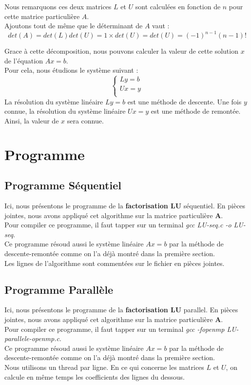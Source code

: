 \documentclass[10pt,a4paper]{article}
\begin{document}
Nous remarquons ces deux matrices $L$ et $U$ sont calculées en fonction de $n$ pour cette matrice particulière $A$.\\

Ajoutons tout de même que le déterminant de $A$ vaut :
$$ det(A)=det(L)det(U)=1 \times det(U)=det(U)=(-1)^{n-1}(n-1)!$$

Grace à cette décomposition, nous pouvons calculer la valeur de cette solution $x$ de l'équation $Ax=b$.\\

Pour cela, nous étudions le système suivant :\\
$$
\left\{
	\begin{array}{ll}
		Ly=b \\
		Ux=y \\	
	\end{array}		
\right.		
$$
La résolution du système linéaire $Ly=b$ est une méthode de descente. Une fois $y$ connue, la résolution du système linéaire $Ux=y$ est une méthode de remontée. Ainsi, la valeur de $x$ sera connue. 


\section{Programme}
\hypertarget{Programme}{}

\subsection{Programme Séquentiel}
\hypertarget{Programme Séquentiel}{}


Ici, nous présentons le programme de la \textbf{factorisation LU} séquentiel. En pièces jointes, nous avons appliqué cet algorithme sur la matrice particulière \textbf{A}. \\
Pour compiler ce programme, il faut tapper sur un terminal \textit{gcc LU-seq.c -o LU-seq}. \\
Ce programme résoud aussi le système linéaire $Ax=b$ par la méthode de descente-remontée comme on l'a déjà montré dans la première section.\\
Les lignes de l'algorithme sont commentées sur le fichier en pièces jointes.



\subsection{Programme Parallèle}
\hypertarget{Programme Parallèle}{}


Ici, nous présentons le programme de la \textbf{factorisation LU} parallel.
En pièces jointes, nous avons appliqué cet algorithme sur la matrice particulière \textbf{A}. \\
Pour compiler ce programme, il faut tapper sur un terminal \textit{gcc -fopenmp LU-parallele-openmp.c}. \\
Ce  programme résoud aussi le système linéaire $Ax=b$ par la méthode de descente-remontée comme on l'a déjà montré dans la première section. \\
Nous utilisons un thread par ligne. En ce qui concerne les matrices $L$ et $U$, on calcule en même temps les coefficients des lignes du dessous. \\
\end{document}
